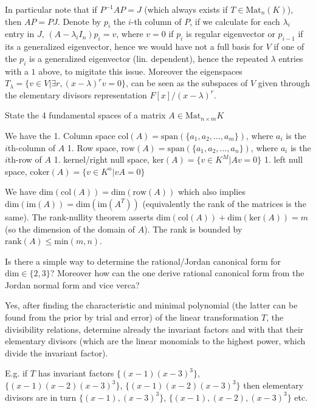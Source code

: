 In particular note that if \(P^{-1}AP = J\) (which always exists if \(T \in \text{Mat}_{n}(K)\)), then \(AP = PJ\).
Denote by \(p_i\) the \(i\)-th column of \(P\), if we calculate for each \(\lambda_i\) entry in \(J\), \((A - \lambda_i I_n)p_i = v\), where \(v = 0\) if \(p_i\) is regular
eigenvector or \(p_{i-1}\) if its a generalized eigenvector, hence we would have not a full basis for \(V\) if one of the \(p_i\) is a generalized
eigenvector (lin. dependent), hence the repeated \(\lambda\) entries with a \(1\) above, to migitate this issue. Moreover the eigenspaces \(T_\lambda = \{ v \in V | \exists r, (x - \lambda)^{r}v = 0 \}\),
can be seen as the subspaces of \(V\) given through the elementary divisors representation \(F[x]/(x - \lambda)^r\).


State the 4 fundamental spaces of a matrix \(A \in \text{Mat}_{n \times m}{K}\)

We have the
1. Column space \(\text{col}(A) = \text{span}(\{a_1, a_2, \dots, a_m\})\), where \(a_i\) is the \(i\)th-column of \(A\)
1. Row space, \(\text{row}(A) = \text{span}(\{a_1, a_2, \dots, a_n\})\), where \(a_i\) is the \(i\)th-row of \(A\)
1. kernel/right null space, \(\text{ker}(A) = \{ v \in K^M | Av = 0\}\)
1. left null space, \(\text{coker}(A) = \{ v \in K^n | vA = 0\}\)


We have \(\text{dim}(\text{col}(A)) = \text{dim}(\text{row}(A))\) which also implies \(\text{dim}(\text{im}(A)) = \text{dim}(\text{im}(A^{T}))\) (equivalently the rank of the matrices is the same).
The rank-nullity theorem asserts \(\text{dim}(\text{col}(A)) + \text{dim}(\text{ker}(A)) = m\) (so the dimension of the domain of \(A\)).
The rank is bounded by \(\text{rank}(A) \leq \text{min}(m, n)\).


Is there a simple way to determine the rational/Jordan canonical form for \(\text{dim} \in \{2, 3\}\)?
Moreover how can the one derive rational canonical form from the Jordan normal form and vice verca?


Yes, after finding the characteristic and minimal polynomial (the latter can be found from the prior by trial and error) of the linear transformation \(T\), 
the divisibility relations, determine already the invariant factors and with that their elementary divisors (which are the linear monomials to the highest power, which divide the invariant factor).

E.g. if \(T\) has invariant factors \(\{(x - 1)(x - 3)^{3}\}\), \(\{(x - 1)(x - 2)(x - 3)^3\}\), \(\{(x - 1)(x - 2)(x - 3)^3\}\) then elementary divisors are in turn \(\{(x - 1), (x - 3)^3\}\), \(\{(x - 1), (x - 2), (x - 3)^3\}\) etc.

